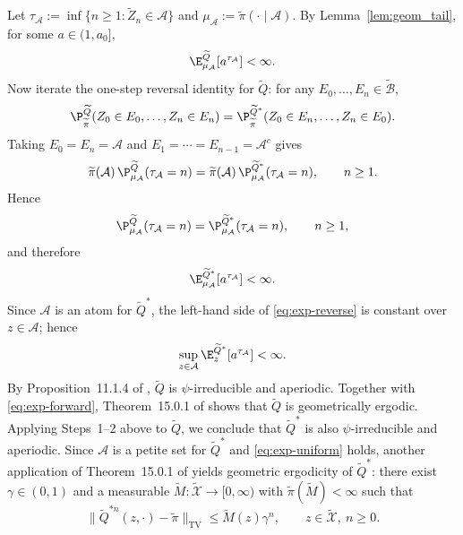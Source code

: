 \documentclass[mnsc,nonblindrev]{informs3}
\begin{document}
Let \(\tau_{\mathcal A}:=\inf\{n\ge1:\widetilde Z_n\in\mathcal A\}\) and
\(\mu_{\mathcal A}:=\widetilde\pi(\cdot\mid \mathcal A)\). By
Lemma~\ref{lem:geom_tail}, for some \(a\in(1,a_0]\),
\begin{equation}\label{eq:exp-forward}
\E_{\mu_{\mathcal A}}^{\widetilde Q}\!\left[a^{\tau_{\mathcal A}}\right]<\infty.
\end{equation}
Now iterate the one-step reversal identity for \(\widetilde Q\): for any
\(E_0,\dots,E_n\in\widetilde{\mathcal B}\),
\[
\P_{\widetilde\pi}^{\widetilde Q}(Z_0\in E_0,\dots,Z_n\in E_n)
=
\P_{\widetilde\pi}^{\widetilde Q^\ast}(Z_0\in E_n,\dots,Z_n\in E_0).
\]
Taking \(E_0=E_n=\mathcal A\) and \(E_1=\cdots=E_{n-1}=\mathcal A^c\) gives
\[
\widetilde\pi(\mathcal A)\,
\P_{\mu_{\mathcal A}}^{\widetilde Q}(\tau_{\mathcal A}=n)
=
\widetilde\pi(\mathcal A)\,
\P_{\mu_{\mathcal A}}^{\widetilde Q^\ast}(\tau_{\mathcal A}=n),
\qquad n\ge1.
\]
Hence
\begin{equation*}
\P_{\mu_{\mathcal A}}^{\widetilde Q}(\tau_{\mathcal A}=n)
=
\P_{\mu_{\mathcal A}}^{\widetilde Q^\ast}(\tau_{\mathcal A}=n),
\qquad n\ge1,
\end{equation*}
and therefore
\begin{equation}\label{eq:exp-reverse}
\E_{\mu_{\mathcal A}}^{\widetilde Q^\ast}\!\left[a^{\tau_{\mathcal A}}\right]
<\infty.
\end{equation}
Since \(\mathcal A\) is an atom for \(\widetilde Q^\ast\), the left-hand side of
\eqref{eq:exp-reverse} is constant over \(z\in\mathcal A\); hence
\begin{equation}\label{eq:exp-uniform}
\sup_{z\in\mathcal A}
\E_{z}^{\widetilde Q^\ast}\!\left[a^{\tau_{\mathcal A}}\right]
<\infty.
\end{equation}
By Proposition~11.1.4 of \cite{douc2018markov}, \(\widetilde Q\) is
\(\psi\)-irreducible and aperiodic. Together with \eqref{eq:exp-forward},
Theorem~15.0.1 of \cite{Meyn12_book} shows that \(\widetilde Q\) is geometrically
ergodic. Applying Steps~1--2 above to \(\widetilde Q\), we conclude that
\(\widetilde Q^\ast\) is also \(\psi\)-irreducible and aperiodic. Since
\(\mathcal A\) is a petite set for \(\widetilde Q^\ast\) and
\eqref{eq:exp-uniform} holds, another application of
Theorem~15.0.1 of \cite{Meyn12_book} yields geometric ergodicity of
\(\widetilde Q^\ast\): there exist \(\gamma\in(0,1)\) and a measurable
\(\widetilde M:\widetilde{\mathcal X}\to[0,\infty)\) with
\(\widetilde\pi(\widetilde M)<\infty\) such that
\begin{equation}\label{eq:geom-tilde}
\bigl\|\widetilde Q^{\ast n}(z,\cdot)-\widetilde\pi\bigr\|_{\mathrm{TV}}
\le \widetilde M(z)\gamma^n,
\qquad z\in\widetilde{\mathcal X},\ n\ge0.
\end{equation}
\end{document}
